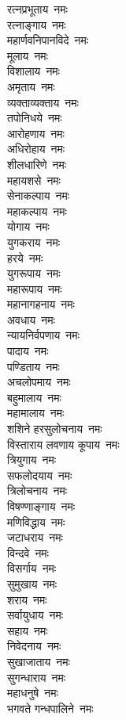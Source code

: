 \begin{multicols}{2}
\begin{flushleft}
रत्नप्रभूताय~नमः\\
रत्नाङ्गाय~नमः\\
महार्णवनिपानविदे~नमः\\
मूलाय~नमः\\
विशालाय~नमः\\
अमृताय~नमः\\
व्यक्ताव्यक्ताय~नमः\\
तपोनिधये~नमः\\
आरोहणाय~नमः\\
अधिरोहाय~नमः\hfill{}\\
शीलधारिणे~नमः\\
महायशसे~नमः\\
सेनाकल्पाय~नमः\\
महाकल्पाय~नमः\\
योगाय~नमः\\
युगकराय~नमः\\
हरये~नमः\\
युगरूपाय~नमः\\
महारूपाय~नमः\\
महानागहनाय~नमः\hfill{}\\
अवधाय~नमः\\
न्यायनिर्वपणाय~नमः\\
पादाय~नमः\\
पण्डिताय~नमः\\
अचलोपमाय~नमः\\
बहुमालाय~नमः\\
महामालाय~नमः\\
शशिने हरसुलोचनाय~नमः\\
विस्ताराय लवणाय कूपाय~नमः\\
त्रियुगाय~नमः\hfill{}\\
सफलोदयाय~नमः\\
त्रिलोचनाय~नमः\\
विषण्णाङ्गाय~नमः\\
मणिविद्धाय~नमः\\
जटाधराय~नमः\\
विन्दवे~नमः\\
विसर्गाय~नमः\\
सुमुखाय~नमः\\
शराय~नमः\\
सर्वायुधाय~नमः\hfill{}\\
सहाय~नमः\\
निवेदनाय~नमः\\
सुखाजाताय~नमः\\
सुगन्धाराय~नमः\\
महाधनुषे~नमः\\
भगवते गन्धपालिने~नमः\\

\end{flushleft}
\end{multicols}

